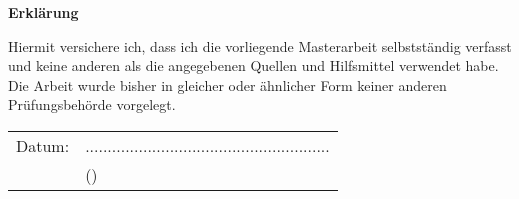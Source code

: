 \begin{center}
	\huge\textbf{Erklärung}\\
	\vspace{1cm}

	\normalsize Hiermit versichere ich, dass ich die vorliegende Masterarbeit selbstständig verfasst und keine anderen als die angegebenen Quellen und Hilfsmittel verwendet  habe. Die Arbeit wurde bisher in gleicher oder ähnlicher Form keiner anderen Prüfungsbehörde vorgelegt.

    \vspace{2cm}

	\begin{tabular}{p{15em}p{15em}}
		Datum: &  .......................................................\\
			   & \centering (\studentName)\\
	\end{tabular}
\end{center}
